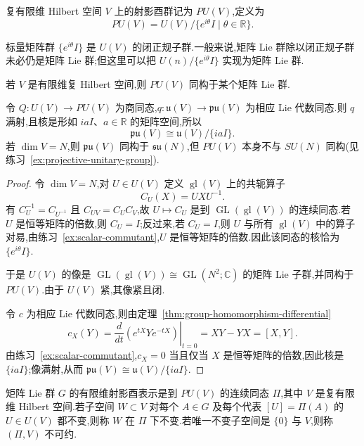 {\begin{definition}[有限维射影酉群]\label{def:projective-unitary-group}
复有限维 Hilbert 空间 $V$ 上的射影酉群记为 $PU(V)$,定义为
\[
PU(V)=U(V)/\{e^{i\theta}I\mid\theta\in\mathbb R\}.
\]
\end{definition}

标量矩阵群 $\{e^{i\theta}I\}$ 是 $U(V)$ 的闭正规子群.一般来说,矩阵 Lie 群除以闭正规子群未必仍是矩阵 Lie 群;但这里可以把 $U(n)/\{e^{i\theta}I\}$ 实现为矩阵 Lie 群.

\begin{proposition}\label{prop:projective-unitary-matrix-lie}
若 $V$ 是有限维复 Hilbert 空间,则 $PU(V)$ 同构于某个矩阵 Lie 群.
\end{proposition}

令 $Q:U(V)\to PU(V)$ 为商同态,$q:\mathfrak u(V)\to\mathfrak{pu}(V)$ 为相应 Lie 代数同态.则 $q$ 满射,且核是形如 $iaI$、$a\in\mathbb R$ 的矩阵空间,所以
\[
\mathfrak{pu}(V)\cong\mathfrak u(V)/\{iaI\}.
\]
若 $\dim V=N$,则 $\mathfrak{pu}(V)$ 同构于 $\mathfrak{su}(N)$,但 $PU(V)$ 本身不与 $SU(N)$ 同构(见练习~\ref{ex:projective-unitary-group}).

\begin{proof}
令 $\dim V=N$,对 $U\in U(V)$ 定义 $\operatorname{gl}(V)$ 上的共轭算子
\[
C_U(X)=UXU^{-1}.
\]
有 $C_U^{-1}=C_{U^{-1}}$ 且 $C_{UV}=C_UC_V$,故 $U\mapsto C_U$ 是到 $\operatorname{GL}(\operatorname{gl}(V))$ 的连续同态.若 $U$ 是恒等矩阵的倍数,则 $C_U=I$;反过来,若 $C_U=I$,则 $U$ 与所有 $\operatorname{gl}(V)$ 中的算子对易,由练习~\ref{ex:scalar-commutant},$U$ 是恒等矩阵的倍数.因此该同态的核恰为 $\{e^{i\theta}I\}$.

于是 $U(V)$ 的像是 $\operatorname{GL}(\operatorname{gl}(V))\cong\operatorname{GL}(N^2;\mathbb C)$ 的矩阵 Lie 子群,并同构于 $PU(V)$.由于 $U(V)$ 紧,其像紧且闭.

令 $c$ 为相应 Lie 代数同态,则由定理~\ref{thm:group-homomorphism-differential}
\[
c_X(Y)=\left.\frac{d}{dt}\left(e^{tX}Ye^{-tX}\right)\right|_{t=0}=XY-YX=[X,Y].
\]
由练习~\ref{ex:scalar-commutant},$c_X=0$ 当且仅当 $X$ 是恒等矩阵的倍数,因此核是 $\{iaI\}$;像满射,从而 $\mathfrak{pu}(V)\cong\mathfrak u(V)/\{iaI\}$.
\end{proof}

\begin{definition}[有限维射影酉表示]\label{def:finite-dimensional-projective-representation}
矩阵 Lie 群 $G$ 的有限维射影酉表示是到 $PU(V)$ 的连续同态 $\Pi$,其中 $V$ 是复有限维 Hilbert 空间.若子空间 $W\subset V$ 对每个 $A\in G$ 及每个代表 $[U]=\Pi(A)$ 的 $U\in U(V)$ 都不变,则称 $W$ 在 $\Pi$ 下不变.若唯一不变子空间是 $\{0\}$ 与 $V$,则称 $(\Pi,V)$ 不可约.
\end{definition}

}
